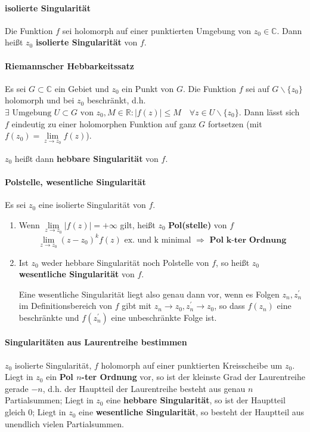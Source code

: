 \documentclass[a4paper, 10pt, DIV20, headings=small]{scrartcl}
\theoremstyle{definition}
\theoremstyle{plain}
\begin{document}
\paragraph{isolierte Singularität}
Die Funktion $f$ sei holomorph auf einer punktierten Umgebung von
$z_0 \in \mathbb{C}$. Dann heißt $z_0$ \textbf{isolierte Singularität} von $f$. 

\paragraph{Riemannscher Hebbarkeitssatz}
Es sei $G \subset \mathbb{C}$ ein Gebiet und $z_0$ ein Punkt von $G$. Die Funktion $f$ sei auf $G \backslash \{z_0\}$ holomorph und bei $z_0$ beschränkt, d.h. $\exists \text{ Umgebung } U \subset G \text{ von } z_0, M \in \mathbb{R} \colon |f(z)| \leq M \quad \forall z \in U \backslash \{z_0\}$. Dann lässt sich $f$ eindeutig zu einer holomorphen Funktion auf ganz $G$ fortsetzen (mit $f(z_0) = \lim\limits_{z \rightarrow z_0} f(z)$).

$z_0$ heißt dann \textbf{hebbare Singularität} von $f$.

\paragraph{Polstelle, wesentliche Singularität}
Es sei $z_0$ eine isolierte Singularität von $f$.
\begin{enumerate}
\item Wenn $\lim\limits_{z \rightarrow z_0} |f(z)| = + \infty$ gilt, heißt $z_0$ \textbf{Pol(stelle)} von $f$
$$\lim\limits_{z \to z_0} (z-z_0)^k f(z) \text{ ex. und k minimal } \Rightarrow \textbf{ Pol k-ter Ordnung}$$
\item Ist $z_0$ weder hebbare Singularität noch Polstelle von $f$, so heißt $z_0$ \textbf{wesentliche Singularität} von $f$.

Eine wesentliche Singularität liegt also genau dann vor, wenn es Folgen $z_n, z_n^\prime$ im
Definitionsbereich von $f$ gibt mit $z_n \rightarrow z_0, z_n^\prime \rightarrow z_0$, so dass $f(z_n)$ eine beschränkte und $f(z_n^\prime)$ eine unbeschränkte Folge ist.

\end{enumerate}

\paragraph{Singularitäten aus Laurentreihe bestimmen}
$z_0$ isolierte Singularität, $f$ holomorph auf einer punktierten Kreisscheibe um $z_0$.
	Liegt in $z_0$ ein \textbf{Pol $n$-ter Ordnung} vor, so ist der kleinste Grad der Laurentreihe gerade $-n$, d.h. der Hauptteil der Laurentreihe besteht aus genau $n$ Partialsummen; 
	Liegt in $z_0$ eine \textbf{hebbare Singularität}, so ist der Hauptteil gleich $0$; 
	Liegt in $z_0$ eine \textbf{wesentliche Singularität}, so besteht der Hauptteil aus unendlich vielen Partialsummen.
\end{document}
